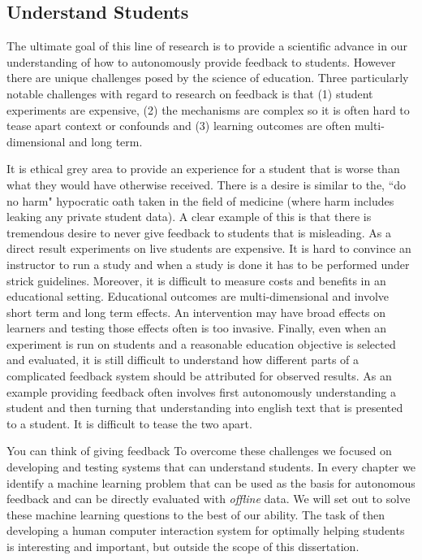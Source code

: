 \subsection{Understand Students}

The ultimate goal of this line of research is to provide a scientific advance in our understanding of how to autonomously provide feedback to students. However there are unique challenges posed by the science of education. Three particularly notable challenges with regard to research on feedback is that (1) student experiments are expensive, (2) the mechanisms are complex so it is often hard to tease apart context or confounds and (3) learning outcomes are often multi-dimensional and long term.

It is ethical grey area to provide an experience for a student that is worse than what they would have otherwise received. There is a desire is similar to the, ``do no harm" hypocratic oath taken in the field of medicine (where harm includes leaking any private student data). A clear example of this is that there is tremendous desire to never give feedback to students that is misleading. As a direct result experiments on live students are expensive. It is hard to convince an instructor to run a study and when a study is done it has to be performed under strick guidelines. Moreover, it is difficult to measure costs and benefits in an educational setting. Educational outcomes are multi-dimensional and involve short term and long term effects. An intervention may have broad effects on learners and testing those effects often is too invasive. Finally, even when an experiment is run on students and a reasonable education objective is selected and evaluated, it is still difficult to understand how different parts of a complicated feedback system should be attributed for observed results. As an example providing feedback often involves first autonomously understanding a student and then turning that understanding into english text that is presented to a student. It is difficult to tease the two apart.

You can think of giving feedback 
To overcome these challenges we focused on developing and testing systems that can understand students. In every chapter we identify a machine learning problem that can be used as the basis for autonomous feedback and can be directly evaluated with \emph{offline} data. We will set out to solve these machine learning questions to the best of our ability. The task of then developing a human computer interaction system for optimally helping students is interesting and important, but outside the scope of this dissertation.

